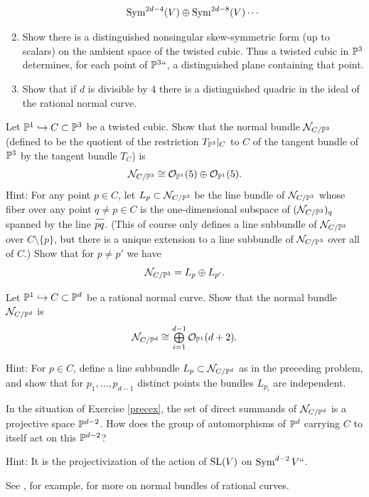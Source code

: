 \begin{exercise}
\begin{enumerate}
 $$
 \operatorname{Sym}^{2d-4}(V)\oplus \operatorname{Sym}^{2d-8}(V) \cdots
 $$
  \item Show  there is a distinguished nonsingular 
%
%
skew-symmetric form (up to scalars) on the ambient space of the twisted cubic. 
Thus a twisted cubic in ${\mathbb P}^3$ determines, for each point of ${\mathbb P}^3` `$, a distinguished plane containing that point. 
 \item Show that if $d$ is divisible by 4 there is a distinguished quadric in the ideal of the rational normal curve.
\end{enumerate}
\end{exercise}

\begin{exercise}\label{Normal bundle of cubic}
Let ${\mathbb P}^1 \hookrightarrow C \subset {\mathbb P}^3$ be a 
twisted cubic.
%
Show that the normal bundle
%
${\mathcal N}_{C/{\mathbb P}^3}$ (defined to be the quotient of the restriction
$T_{{\mathbb P}^3}|_C$ to $C$ of the tangent bundle  of ${\mathbb P}^3$  by the
tangent bundle $T_C$) is 
$$
{\mathcal N}_{C/{\mathbb P}^3} \cong {\mathcal O}_{{\mathbb P}^1}(5) \oplus  {\mathcal O}_{{\mathbb P}^1}(5).
$$
Hint: For any point $p \in C$, let $L_p \subset {\mathcal N}_{C/{\mathbb P}^3}$ be the 
%
line bundle
of ${\mathcal N}_{C/{\mathbb P}^3}$ whose fiber over any point $q \neq p \in C$ is the
one-dimensional subspace of $({\mathcal N}_{C/{\mathbb P}^3})_q$ spanned by the line
$\overkern20{pq}$. (This of course only defines a line subbundle of
${\mathcal N}_{C/{\mathbb P}^3}$ over $C \setminus \{p\}$, but there is a unique
extension to a line subbundle of ${\mathcal N}_{C/{\mathbb P}^3}$ over all of $C$.)
Show that for $p \neq p'$ we have
$$
{\mathcal N}_{C/{\mathbb P}^3} = L_p \oplus L_{p'}.
$$
\end{exercise}

\begin{exercise}
Let ${\mathbb P}^1 \hookrightarrow C \subset {\mathbb P}^d$ be a rational normal
%
curve. Show that the 
normal bundle
%
${\mathcal N}_{C/{\mathbb P}^d}$  is 
$$
\textstyle
{\mathcal N}_{C/{\mathbb P}^d} \cong \bigoplus\limits_{i=1}^{d-1} {\mathcal O}_{{\mathbb P}^1}(d+2).
$$

Hint: For $p \in C$, define a line subbundle $L_p \subset {\mathcal N}_{C/{\mathbb P}^d}$ as in the preceding problem, and show that for $p_1,\dots,p_{d-1}$ distinct points the bundles $L_{p_i}$ are independent.
\label{precex}
\end{exercise}

\begin{exercise}
In the situation of 
Exercise \ref{precex},
the set  of direct summands
of ${\mathcal N}_{C/{\mathbb P}^d} $ is a projective space ${\mathbb P}^{d-2}$. How does the
group of automorphisms of ${\mathbb P}^d$ carrying $C$ to itself act on this ${\mathbb P}^{d-2}$?

Hint: It is the projectivization of the action of $\operatorname{SL}(V)$ on $\operatorname{Sym}^{d-2}V` `$.

See \cite{MR3778979}, for example,
for more on normal bundles of rational curves.
\end{exercise}

